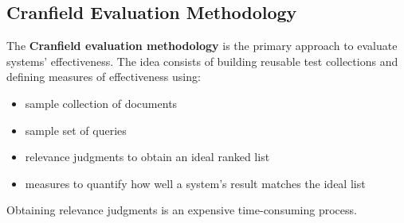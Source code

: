 \documentclass{article}
\begin{document}
\subsection{Cranfield Evaluation Methodology}
The \textbf{Cranfield evaluation methodology} is the primary approach to evaluate systems' effectiveness. The idea consists of building reusable test collections and defining measures of effectiveness using:
\begin{itemize}
    \item sample collection of documents
    \item sample set of queries
    \item relevance judgments to obtain an ideal ranked list
    \item measures to quantify how well a system's result matches the ideal list
\end{itemize}
Obtaining relevance judgments is an expensive time-consuming process.
\end{document}
